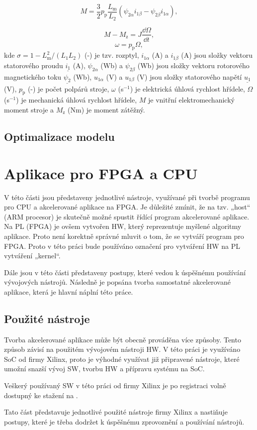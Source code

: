 \documentclass[a4paper, twoside, 11pt]{article}
\begin{document}
\begin{equation}
    M = \frac{3}{2} p_\text{p} \frac{L_\text{m}}{L_2} (\psi_{2\alpha} i_{1\beta} - \psi_{2\beta} i_{1\alpha}),
\end{equation}

\begin{equation}
    M - M_\text{z} = J \frac{\dd{\Omega}}{\dd{t}},
\end{equation}
\begin{equation}
    \omega = p_\text{p} \Omega,
\end{equation}
kde $\sigma = 1 - L_\text{m}^{2}/(L_1 L_2)$ (-) je tzv. rozptyl, $i_{1\alpha}$ (A) a $i_{1\beta}$ (A) jsou složky vektoru statorového proudu $\underline{i_1}$ (A), $\psi_{2\alpha}$ (Wb) a $\psi_{2\beta}$ (Wb) jsou složky vektoru rotorového magnetického toku $\underline{\psi_2}$ (Wb), $u_{1\alpha}$ (V) a $u_{1\beta}$ (V) jsou složky statorového napětí $\underline{u_1}$ (V), $p_\text{p}$ (-) je počet polpárů stroje, $\omega$ (s$^{-1}$) je elektrická úhlová rychlost hřídele, $\Omega$ (s$^{-1}$) je mechanická úhlová rychlost hřídele, $M$ je vnitřní elektromechanický moment stroje a $M_\text{z}$ (Nm) je moment zátěžný.

	\subsection{Optimalizace modelu}

\section{Aplikace pro FPGA a CPU}
V této části jsou představeny jednotlivé nástroje, využívané při tvorbě programu pro CPU a akcelerované aplikace na FPGA. Je důležité zmínit, že na tzv. „host“ (ARM procesor) je skutečně možné spustit řídící program akcelerované aplikace. Na PL (FPGA) je ovšem vytvořen HW, který reprezentuje myšlené algoritmy aplikace. Proto není korektně správné mluvit o tom, že se vytváří program pro FPGA. Proto v této práci bude používáno označení pro vytváření HW na PL vytváření „kernel“.\par
	Dále jsou v této části představeny postupy, které vedou k úspěšnému používání vývojových nástrojů. Následně je popsána tvorba samostatné akcelerované aplikace, která je hlavní náplní této práce.
	\subsection{Použité nástroje}
		Tvorba akcelerované aplikace může být obecně prováděna více způsoby. Tento způsob závisí na použitém vývojovém nástroji HW. V této práci je využíváno SoC od firmy Xilinx, proto je výhodné využívat již připravené nástroje, které umožní snazší vývoj SW, tvorbu HW a přípravu systému na SoC.\par
		Veškerý používaný SW v této práci od firmy Xilinx je po registraci volně dostupný ke stažení na \cite{xilinx-downloads}.\par
		Tato část představuje jednotlivé použité nástroje firmy Xilinx a nastiňuje postupy, které je třeba dodržet k úspěšnému zprovoznění a používání nástrojů.
\end{document}
